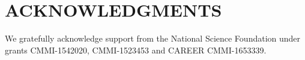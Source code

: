 \documentclass{wscpaperproc}
\theoremstyle{wsc}
\begin{document}

\section*{ACKNOWLEDGMENTS}
We gratefully acknowledge support from the National Science Foundation under grants CMMI-1542020, CMMI-1523453 and CAREER CMMI-1653339.





% 
% 


 
 
 





\end{document}
